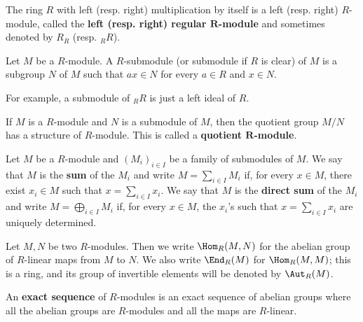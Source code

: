 \begin{example}
The ring $R$ with left (resp. right) multiplication by itself is a left (resp. right) $R$-module, called the \textbf{left (resp. right) regular $\bm{R}$-module} and sometimes denoted by $R_R$ (resp. $_{R}R$).
\end{example}
\begin{definition}
Let $M$ be a $R$-module. A $R$-submodule (or submodule if $R$ is clear) of $M$ is a subgroup $N$ of $M$ such that $ax\in N$ for every $a\in R$ and $x\in N$.
\end{definition}
For example, a submodule of $_{R}R$ is just a left ideal of $R$.
\begin{definition}
If $M$ is a $R$-module and $N$ is a submodule of $M$, then the quotient group
$M/N$ has a structure of $R$-module. This is called a \textbf{quotient $\bm{R}$-module}.
\end{definition}
\begin{definition}
Let $M$ be a $R$-module and $(M_i)_{i\in I}$ be a family of submodules of $M$. We say that $M$ is the \textbf{sum} of the $M_i$ and write $M=\sum_{i\in I}M_i$ if, for every $x\in M$, there exist $x_i\in M$ such that $x=\sum_{i\in I}x_i$. We say that $M$ is the \textbf{direct sum} of the $M_i$ and write $M=\bigoplus_{i\in I}M_i$ if, for every $x\in M$, the $x_i$'s such that $x=\sum_{i\in I}x_i$ are uniquely determined.
\end{definition}
Let $M,N$ be two $R$-modules. Then we write $\Hom_R(M,N)$ for the abelian group of $R$-linear maps from $M$ to $N$. We also write $\End_R(M)$ for $\Hom_R(M,M)$; this is a ring, and its group of invertible elements will be denoted by $\Aut_R(M)$.
\begin{definition}
An \textbf{exact sequence} of $R$-modules is an exact sequence of abelian groups where all the abelian groups are $R$-modules and all the maps are $R$-linear.
\end{definition}

